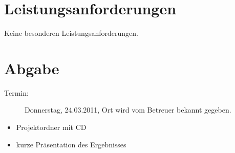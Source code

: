 \documentclass[	a4paper,		%
		titlepage, 		%
		fontsize=12pt		%
		]{scrartcl} 		%
\begin{document}
\section{Leistungsanforderungen}
Keine besonderen Leistungsanforderungen.

\section{Abgabe}
\begin{description}
 \item[Termin:] Donnerstag, 24.03.2011, Ort wird vom Betreuer bekannt gegeben.
 \end{description}
\begin{itemize}
 \item Projektordner mit CD
 \item kurze Präsentation des Ergebnisses
\end{itemize}




%
%

\end{document}
